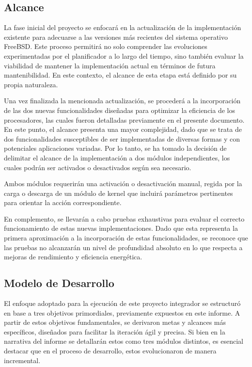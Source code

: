\subsection{Alcance}
La fase inicial del proyecto se enfocará en la actualización de la implementación existente para adecuarse a las versiones más recientes del sistema operativo FreeBSD. Este proceso permitirá no solo comprender las evoluciones experimentadas por el planificador a lo largo del tiempo, sino también evaluar la viabilidad de mantener la implementación actual en términos de futura mantenibilidad. En este contexto, el alcance de esta etapa está definido por su propia naturaleza.\par

Una vez finalizada la mencionada actualización, se procederá a la incorporación de las dos nuevas funcionalidades diseñadas para optimizar la eficiencia de los procesadores, las cuales fueron detalladas previamente en el presente documento. En este punto, el alcance presenta una mayor complejidad, dado que se trata de dos funcionalidades susceptibles de ser implementadas de diversas formas y con potenciales aplicaciones variadas. Por lo tanto, se ha tomado la decisión de delimitar el alcance de la implementación a dos módulos independientes, los cuales podrán ser activados o desactivados según sea necesario.\par

Ambos módulos requerirán una activación o desactivación manual, regida por la carga o descarga de un módulo de kernel que incluirá parámetros pertinentes para orientar la acción correspondiente.\par

En complemento, se llevarán a cabo pruebas exhaustivas para evaluar el correcto funcionamiento de estas nuevas implementaciones. Dado que esta representa la primera aproximación a la incorporación de estas funcionalidades, se reconoce que las pruebas no alcanzarán un nivel de profundidad absoluto en lo que respecta a mejoras de rendimiento y eficiencia energética.\par

\subsection{Modelo de Desarrollo}
El enfoque adoptado para la ejecución de este proyecto integrador se estructuró en base a tres objetivos primordiales, previamente expuestos en este informe. A partir de estos objetivos fundamentales, se derivaron metas y alcances más específicos, diseñados para facilitar la iteración ágil y precisa. Si bien en la narrativa del informe se detallarán estos como tres módulos distintos, es esencial destacar que en el proceso de desarrollo, estos evolucionaron de manera incremental.

